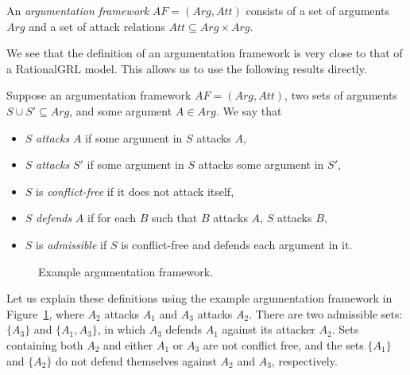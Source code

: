 \begin{definition}
\label{def:argumentation-framework}
An \emph{argumentation framework} $AF=(Arg,Att)$ consists of a set of arguments $Arg$ and a set of attack relations $Att\subseteq Arg\times Arg.$
\end{definition}

We see that the definition of an argumentation framework is very close to that of a RationalGRL model. This allows us to use the following results directly.

\begin{definition} Suppose an argumentation framework $AF=(Arg,Att)$, two sets of arguments $S\cup S'\subseteq Arg$, and some argument $A\in Arg$. We say that
\begin{itemize}
\item $S$ \emph{attacks} $A$ if some argument in $S$ attacks $A$,
\item $S$ \emph{attacks} $S'$ if some argument in $S$ attacks some argument in $S'$,
\item $S$ is \emph{conflict-free} if it does not attack itself,
\item $S$ \emph{defends} $A$ if for each $B$ such that $B$ attacks $A$, $S$ attacks $B$,
\item $S$ is \emph{admissible} if $S$ is conflict-free and defends each argument in it.
\end{itemize}
\end{definition}

\begin{figure}[ht!]
\centering
{}
\caption{Example argumentation framework.}
\label{fig:goalmodeling:arg2}
\end{figure}

Let us explain these definitions using the example argumentation framework in Figure~\ref{fig:goalmodeling:arg2}, where $A_2$ attacks $A_1$ and $A_3$ attacks $A_2$. There are two admissible sets: $\{A_3\}$ and $\{A_1, A_3\}$, in which $A_3$ defends $A_1$ against its attacker $A_2$. Sets containing both $A_2$ and either $A_1$ or $A_3$ are not conflict free, and the sets $\{A_1\}$ and $\{A_2\}$ do not defend themselves against $A_2$ and $A_3$, respectively. 

